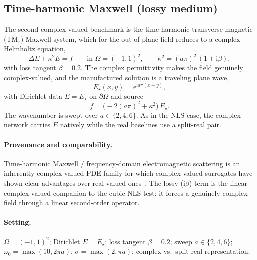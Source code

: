 \subsection{Time-harmonic Maxwell (lossy medium)}\label{sec:bm:maxwell}

The second complex-valued benchmark is the time-harmonic transverse-magnetic
(TM\(_z\)) Maxwell system, which for the out-of-plane field reduces to a complex
Helmholtz equation,
\begin{equation}\label{eq:maxwell_pde}
  \Delta E + \kappa^2 E = f
  \qquad \text{in } \Omega = (-1,1)^2,
  \qquad \kappa^2 = (a\pi)^2\,(1 + \mathrm{i}\beta),
\end{equation}
with loss tangent \(\beta = 0.2\). The complex permittivity makes the field
genuinely complex-valued, and the manufactured solution is a traveling plane
wave,
\begin{equation}\label{eq:maxwell_sol}
  E_\star(x,y) = \mathrm{e}^{\mathrm{i}a\pi(x+y)},
\end{equation}
with Dirichlet data \(E = E_\star\) on \(\partial\Omega\) and source
\begin{equation}\label{eq:maxwell_source}
  f = \big(-2(a\pi)^2 + \kappa^2\big)\,E_\star .
\end{equation}
The wavenumber is swept over \(a \in \{2,4,6\}\). As in the NLS case, the complex
network carries \(E\) natively while the real baselines use a split-real pair.

\paragraph{Provenance and comparability.}
Time-harmonic Maxwell / frequency-domain electromagnetic scattering is an
inherently complex-valued PDE family for which complex-valued surrogates have
shown clear advantages over real-valued ones~\cite{Jiang2024Maxwell}. The lossy
(\(\mathrm{i}\beta\)) term is the linear complex-valued companion to the cubic
NLS test: it forces a genuinely complex field through a linear second-order
operator.

\paragraph{Setting.}
\(\Omega=(-1,1)^2\); Dirichlet \(E=E_\star\); loss tangent \(\beta=0.2\); sweep
\(a\in\{2,4,6\}\); \(\omega_0=\max(10,2\pi a)\), \(\sigma=\max(2,\pi a)\);
complex vs.\ split-real representation.
